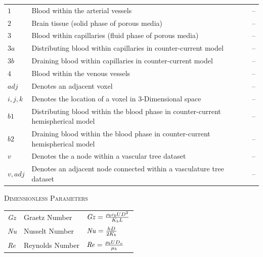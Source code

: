 \documentclass[11pt,english,a4paper,twoside,openright]{report}
\newcommand\Nuss{\mbox{\textit{Nu}}}
\newcommand\Reynolds{\mbox{\textit{Re}}}
\newcommand\Graetz{\mbox{\textit{Gz}}}
\begin{document}
{{{{{{\begin{center}
\begin{longtable}[H]{L{0.1\textwidth} L{0.50\textwidth} R{0.15\textwidth}}
		$1$ & Blood within the arterial vessels & -- \\
		$2$ & Brain tissue (solid phase of porous media) & -- \\
		$3$ & Blood within capillaries (fluid phase of porous media) & -- \\
		$3a$ & Distributing blood within capillaries in counter-current model & -- \\
		$3b$ & Draining blood within capillaries in counter-current model & -- \\
		$4$ & Blood within the venous vessels & -- \\
		$adj$ & Denotes an adjacent voxel & -- \\
		$i,j,k$ & Denotes the location of a voxel in 3-Dimensional space & -- \\
		$b1$ & Distributing blood within the blood phase in counter-current hemispherical model & -- \\
		$b2$ & Draining blood within the blood phase in counter-current hemispherical model & -- \\
		$v$ & Denotes the a node within a vascular tree dataset & -- \\
		$v,adj$ & Denotes an adjacent node connected within a vasculature tree dataset & -- \\
					
	\end{longtable}
	\end{center}
	\vspace*{-\baselineskip}
		{\selectfont\textsc{Dimensionless Parameters}
			\vspace*{-\baselineskip}
			\begin{center}	
				\begin{longtable}[H]{L{0.1\textwidth} L{0.30\textwidth} R{0.35\textwidth}}
					
					\Graetz & Graetz Number & $\Graetz = \frac{\rho_{b}c_{b}UD^{2}}{K_{b}L}$ \\	
					\Nuss & Nusselt Number & $\Nuss = \frac{hD}{2K_{b}}$ \\
					\Reynolds & Reynolds Number & $\Reynolds = \frac{\rho_{b}UD_{v}}{\mu_{b}}$ \\
					

\end{longtable}
\end{center}}}}}}}}
\end{document}
